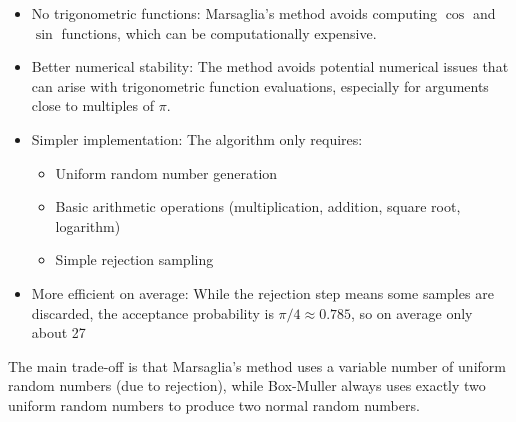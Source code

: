 \begin{itemize}
    \item No trigonometric functions: Marsaglia's method avoids computing $\cos$ and $\sin$ functions, which can be computationally expensive.
    \item Better numerical stability: The method avoids potential numerical issues that can arise with trigonometric function evaluations, especially for arguments close to multiples of $\pi$.
    \item Simpler implementation: The algorithm only requires:
    \begin{itemize}
        \item Uniform random number generation
        \item Basic arithmetic operations (multiplication, addition, square root, logarithm)
        \item Simple rejection sampling
    \end{itemize}
    \item More efficient on average: While the rejection step means some samples are discarded, the acceptance probability is $\pi/4 \approx 0.785$, so on average only about 27%
\end{itemize}

The main trade-off is that Marsaglia's method uses a variable number of uniform random numbers (due to rejection), while Box-Muller always uses exactly two uniform random numbers to produce two normal random numbers.